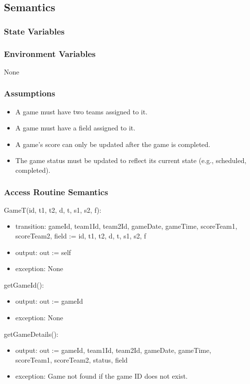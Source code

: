 \documentclass[12pt, titlepage]{article}
\begin{document}
\subsection{Semantics}

\subsubsection{State Variables}

\subsubsection{Environment Variables}
None

\subsubsection{Assumptions}
\begin{itemize}
  \item A game must have two teams assigned to it.
  \item A game must have a field assigned to it.
  \item A game's score can only be updated after the game is completed.
  \item The game status must be updated to reflect its current state (e.g., scheduled, completed).
\end{itemize}

\subsubsection{Access Routine Semantics}

\noindent GameT(id, t1, t2, d, t, s1, s2, f):
\begin{itemize}
  \item transition: gameId, team1Id, team2Id, gameDate, gameTime, scoreTeam1, scoreTeam2, field := id, t1, t2, d, t, s1, s2, f
  \item output: out := self
  \item exception: None
\end{itemize}

\noindent getGameId():
\begin{itemize}
  \item output: out := gameId
  \item exception: None
\end{itemize}

\noindent getGameDetails():
\begin{itemize}
  \item output: out :=  gameId, team1Id, team2Id, gameDate, gameTime, scoreTeam1, scoreTeam2, status, field
  \item exception: Game not found if the game ID does not exist.
\end{itemize}
\end{document}
